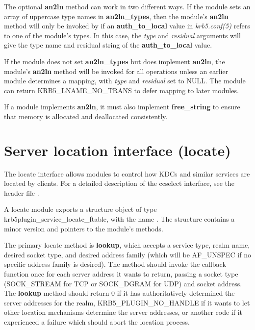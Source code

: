\documentclass[letterpaper,10pt,english]{sphinxmanual}
\begin{document}
The optional \textbf{an2ln} method can work in two different ways.  If the
module sets an array of uppercase type names in \textbf{an2ln\_types}, then
the module's \textbf{an2ln} method will only be invoked by
 if an \textbf{auth\_to\_local} value in
\emph{krb5.conf(5)} refers to one of the module's types.  In this
case, the \emph{type} and \emph{residual} arguments will give the type name and
residual string of the \textbf{auth\_to\_local} value.

If the module does not set \textbf{an2ln\_types} but does implement
\textbf{an2ln}, the module's \textbf{an2ln} method will be invoked for all
 operations unless an earlier module
determines a mapping, with \emph{type} and \emph{residual} set to NULL.  The
module can return KRB5\_LNAME\_NO\_TRANS to defer mapping to later
modules.

If a module implements \textbf{an2ln}, it must also implement
\textbf{free\_string} to ensure that memory is allocated and deallocated
consistently.


\section{Server location interface (locate)}
\label{plugindev/locate:server-location-interface-locate}\label{plugindev/locate::doc}
The locate interface allows modules to control how KDCs and similar
services are located by clients.  For a detailed description of the
ccselect interface, see the header file .

A locate module exports a structure object of type
krb5plugin\_service\_locate\_ftable, with the name .
The structure contains a minor version and pointers to the module's
methods.

The primary locate method is \textbf{lookup}, which accepts a service type,
realm name, desired socket type, and desired address family (which
will be AF\_UNSPEC if no specific address family is desired).  The
method should invoke the callback function once for each server
address it wants to return, passing a socket type (SOCK\_STREAM for TCP
or SOCK\_DGRAM for UDP) and socket address.  The \textbf{lookup} method
should return 0 if it has authoritatively determined the server
addresses for the realm, KRB5\_PLUGIN\_NO\_HANDLE if it wants to let
other location mechanisms determine the server addresses, or another
code if it experienced a failure which should abort the location
process.
\end{document}

